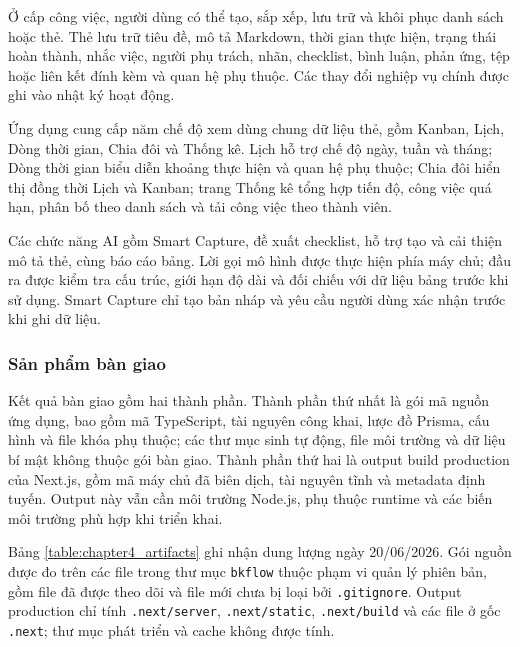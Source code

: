 \documentclass[../DoAn.tex]{subfiles}
\begin{document}
Ở cấp công việc, người dùng có thể tạo, sắp xếp, lưu trữ và khôi phục danh sách hoặc thẻ. Thẻ lưu trữ tiêu đề, mô tả Markdown, thời gian thực hiện, trạng thái hoàn thành, nhắc việc, người phụ trách, nhãn, checklist, bình luận, phản ứng, tệp hoặc liên kết đính kèm và quan hệ phụ thuộc. Các thay đổi nghiệp vụ chính được ghi vào nhật ký hoạt động.

Ứng dụng cung cấp năm chế độ xem dùng chung dữ liệu thẻ, gồm Kanban, Lịch, Dòng thời gian, Chia đôi và Thống kê. Lịch hỗ trợ chế độ ngày, tuần và tháng; Dòng thời gian biểu diễn khoảng thực hiện và quan hệ phụ thuộc; Chia đôi hiển thị đồng thời Lịch và Kanban; trang Thống kê tổng hợp tiến độ, công việc quá hạn, phân bố theo danh sách và tải công việc theo thành viên.

Các chức năng AI gồm Smart Capture, đề xuất checklist, hỗ trợ tạo và cải thiện mô tả thẻ, cùng báo cáo bảng. Lời gọi mô hình được thực hiện phía máy chủ; đầu ra được kiểm tra cấu trúc, giới hạn độ dài và đối chiếu với dữ liệu bảng trước khi sử dụng. Smart Capture chỉ tạo bản nháp và yêu cầu người dùng xác nhận trước khi ghi dữ liệu.

\subsubsection{Sản phẩm bàn giao}

Kết quả bàn giao gồm hai thành phần. Thành phần thứ nhất là gói mã nguồn ứng dụng, bao gồm mã TypeScript, tài nguyên công khai, lược đồ Prisma, cấu hình và file khóa phụ thuộc; các thư mục sinh tự động, file môi trường và dữ liệu bí mật không thuộc gói bàn giao. Thành phần thứ hai là output build production của Next.js, gồm mã máy chủ đã biên dịch, tài nguyên tĩnh và metadata định tuyến. Output này vẫn cần môi trường Node.js, phụ thuộc runtime và các biến môi trường phù hợp khi triển khai.

Bảng \ref{table:chapter4_artifacts} ghi nhận dung lượng ngày 20/06/2026. Gói nguồn được đo trên các file trong thư mục \texttt{bkflow} thuộc phạm vi quản lý phiên bản, gồm file đã được theo dõi và file mới chưa bị loại bởi \texttt{.gitignore}. Output production chỉ tính \texttt{.next/server}, \texttt{.next/static}, \texttt{.next/build} và các file ở gốc \texttt{.next}; thư mục phát triển và cache không được tính.
\end{document}
